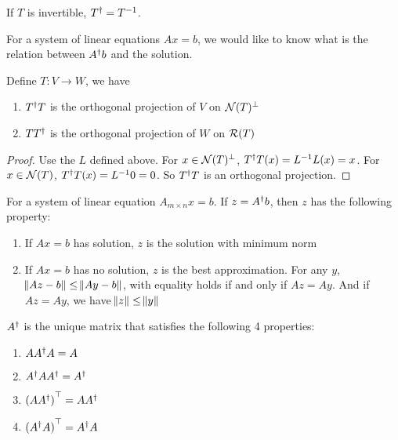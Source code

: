 If $T$ is invertible, ${T}^\dagger = {T}^{-1}$.


For a system of linear equations $Ax=b$, we would like to know what is the relation between ${A}^\dagger b$ and the solution.

\begin{theorem}
    Define $T:V \rightarrow W$, we have
    \begin{enumerate}
        \item ${T}^\dagger T$ is the orthogonal projection of $V$ on $\mathcal{N}(T)^\perp$
        \item $T {T}^\dagger$ is the orthogonal projection of $W$ on $\mathcal{R}(T)$
    \end{enumerate}
\end{theorem}
\begin{proof}
    Use the $L$ defined above. For $x \in \mathcal{N}(T)^\perp$, ${T}^\dagger T(x) = {L}^{-1}L(x) = x$. For $x \in \mathcal{N}(T)$, ${T}^\dagger T(x) = {L}^{-1} 0 = 0$. So ${T}^\dagger T$ is an orthogonal projection.
\end{proof}

\begin{theorem}
    For a system of linear equation $A_{m \times n}x=b$. If $z = {A}^\dagger b$, then $z$ has the following property:
    \begin{enumerate}
        \item If $Ax=b$ has solution, $z$ is the solution with minimum norm
        \item If $Ax=b$ has no solution, $z$ is the best approximation. For any $y$, $\norm{Az-b} \leq \norm{Ay-b}$, with equality holds if and only if $Az = Ay$. And if $Az = Ay$, we have $\norm{z} \leq \norm{y}$
    \end{enumerate}
\end{theorem}

\begin{theorem}
    ${A}^\dagger$ is the unique matrix that satisfies the following 4 properties:
    \begin{enumerate}
        \item $A {A}^\dagger A = A$
        \item ${A}^\dagger A{A}^\dagger = {A}^\dagger$
        \item ${(A {A}^\dagger)}^\top = A {A}^\dagger$
        \item ${({A}^\dagger A)}^\top = {A}^\dagger A$
    \end{enumerate}
\end{theorem}



